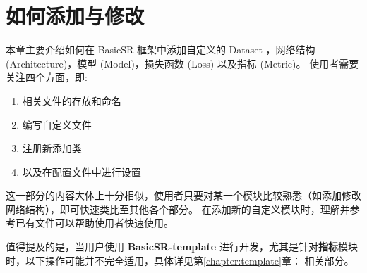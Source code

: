 \documentclass[../main.tex]{subfiles}
\begin{document}
\chapter{如何添加与修改}
\vspace{-2cm}

本章主要介绍如何在 BasicSR 框架中添加自定义的 Dataset ，网络结构 (Architecture)，模型 (Model)，损失函数 (Loss) 以及指标 (Metric)。
使用者需要关注四个方面，即:
\begin{enumerate}
    \item 相关文件的存放和命名
    \item 编写自定义文件
    \item 注册新添加类
    \item 以及在配置文件中进行设置
\end{enumerate}
这一部分的内容大体上十分相似，使用者只要对某一个模块比较熟悉（如添加修改网络结构），即可快速类比至其他各个部分。
在添加新的自定义模块时，理解并参考已有文件可以帮助使用者快速使用。

值得提及的是，当用户使用 \textbf{BasicSR-template} 进行开发，尤其是针对\textbf{指标}模块时，以下操作可能并不完全适用，具体详见第\ref{chapter:template}章： 相关部分。

\end{document}
